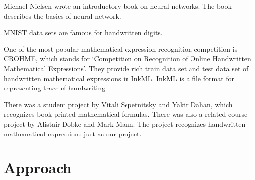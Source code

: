 \documentclass[10pt,twocolumn,letterpaper]{article}
\begin{document}
Michael Nielsen\cite{MichaelNielsen} wrote an introductory book on neural networks.
The book describes the basics of neural network.

MNIST\cite{MNIST} data sets are famous for handwritten digits.

One of the most popular mathematical expression recognition competition is CROHME,
which stands for
`Competition on Recognition of Online Handwritten Mathematical Expressions'\cite{CROHME}.
They provide rich train data set and test data set of handwritten mathematical expressions
in InkML. InkML is a file format for representing trace of handwriting.


There was a student project by Vitali Sepetnitsky and Yakir Dahan\cite{OCRMATH}, which recognizes book printed mathematical formulas.
There was also a related course project by Alistair Dobke and Mark Mann\cite{OCRMATH2}. The project recognizes handwritten mathematical expressions just as our project.



\section{Approach}

%
%
%
%
%
%
\end{document}
